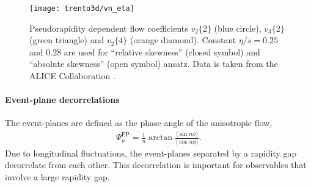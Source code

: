 \begin{figure}
\singlespacing 
\texttt{[image: trento3d/vn\_eta]}
\caption[Pseudorapidity dependent flow coefficients $v_2\{2\}$ (blue circle), ]{Pseudorapidity dependent flow coefficients $v_2\{2\}$ (blue circle), $v_3\{2\}$ (green triangle) and $v_2\{4\}$ (orange diamond).
Constant $\eta/s=0.25$ and $0.28$ are used for ``relative skewness'' (closed symbol) and ``absolute skewness'' (open symbol) ansatz. Data is taken from the ALICE Collaboration \cite{Adam:2016ows}.}
\label{fig:trento:vn_eta}
\end{figure}

\paragraph{Event-plane decorrelations} The event-planes are defined as the phase angle of the anisotropic flow,
\begin{eqnarray}
\Psi_n^\text{EP} = \frac{1}{n}\arctan\frac{\langle \sin n \phi \rangle}{\langle\cos n \phi \rangle}.
\end{eqnarray}
Due to longitudinal fluctuations, the event-planes separated by a rapidity gap decorrelate from each other.
This decorrelation is important for observables that involve a large rapidity gap.

